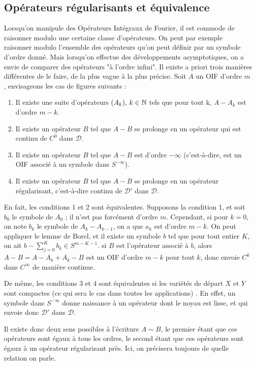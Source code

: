 \subsection{Opérateurs régularisants et équivalence}
Lorsqu'on manipule des Opérateurs Intégraux de Fourier, il est commode de raisonner modulo une certaine classe d'opérateurs. On peut par exemple raisonner modulo l'ensemble des opérateurs qu'on peut définir par un symbole d'ordre donné. Mais lorsqu'on effectue des développements asymptotiques, on a envie de comparer des opérateurs "à l'ordre infini". Il existe a priori trois manières différentes de le faire, de la plus vague à la plus précise. Soit $A$ un OIF d'ordre $m$, envisageons les cas de figures suivants :
\begin{enumerate}
	\item Il existe une suite d'opérateurs $(A_k),\,k\in \mathbb{N}$ tels que pour tout k, $A-A_k$ est d'ordre $m-k$.
	\item Il existe un opérateur $B$ tel que $A-B$ se prolonge en un opérateur qui est continu de $C^0$ dans $\mathcal{D}$. 
	\item Il existe un opérateur $B$ tel que $A-B$ est d'ordre $-\infty$ (c'est-à-dire, est un OIF associé à un symbole dans $S^{-\infty}$).
	\item Il existe un opérateur $B$ tel que $A-B$ se prolonge en un opérateur régularisant, c'est-à-dire continu de $\mathcal{D'}$ dans $\mathcal{D}$.
\end{enumerate}

En fait, les conditions 1 et 2 sont équivalentes. Supposons la condition 1, et soit $b_0$ le symbole de $A_0$ ; il n'est pas forcément d'ordre $m$. Cependant, si pour $k=0$, on note $b_k$ le symbole de $A_k-A_{k-1}$, on a que $a_k$ est d'ordre $m-k$. On peut appliquer le lemme de Borel, et il existe un symbole $b$ tel que pour tout entier $K$, on ait $b-\sum_{j=0}^Kb_k\in S^{m-K-1}$. si $B$ est l'opérateur associé à $b$, alors $A-B=A-A_k+A_k-B$ est un OIF d'ordre $m-k$ pour tout $k$, donc envoie $C^0$ dans $C^{\infty}$ de manière continue.

De même, les conditions $3$ et $4$ sont équivalentes si les variétés de départ $X$ et $Y$ sont compactes (ce qui sera le cas dans toutes les applications) . En effet, un symbole dans $S^{-\infty}$ donne naissance à un opérateur dont le noyau est lisse, et qui envoie donc $\mathcal{D}'$ dans $\mathcal{D}$.

Il existe donc deux sens possibles à l'écriture $A\sim B$, le premier étant que ces opérateurs sont égaux à tous les ordres, le second étant que ces opérateurs sont égaux à un opérateur régularisant près. Ici, on précisera toujours de quelle relation on parle.